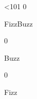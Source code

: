 \documentclass{article}
\begin{document}
\setcounter{int}{1}  %

\loop \ifnum \value{int}<101
      {0} {FizzBuzz \par}{
         {0} {Buzz \par}{
             {0} {Fizz \par}{
                \theint \par
            }
        }
    }
    \addtocounter{int}{1}
\repeat
\end{document}
